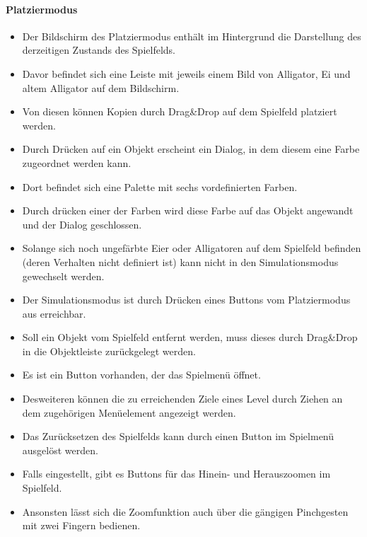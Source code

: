 \paragraph{Platziermodus}
\begin{itemize}
\item Der Bildschirm des Platziermodus enthält im Hintergrund die Darstellung
des derzeitigen Zustands des Spielfelds.
\item Davor befindet sich eine Leiste mit jeweils einem Bild von Alligator, Ei und altem Alligator auf dem Bildschirm.
\item Von diesen können Kopien durch Drag\&Drop auf dem Spielfeld platziert werden. 
\item  Durch Drücken auf ein Objekt erscheint 
ein Dialog, in dem diesem eine Farbe zugeordnet werden kann.
\item Dort befindet sich eine Palette mit sechs vordefinierten Farben.
\item Durch drücken einer der Farben wird diese Farbe auf das Objekt angewandt und der Dialog geschlossen.
\item Solange sich noch ungefärbte Eier oder Alligatoren auf dem Spielfeld befinden (deren Verhalten
nicht definiert ist) kann nicht in den Simulationsmodus gewechselt werden.
\item Der Simulationsmodus ist durch Drücken eines Buttons vom Platziermodus
aus erreichbar.
\item Soll ein Objekt vom Spielfeld entfernt werden, muss dieses durch Drag\&Drop
in die Objektleiste zurückgelegt werden.
\item Es ist ein Button vorhanden, der das Spielmenü öffnet.
\item Desweiteren können die zu erreichenden Ziele eines Level durch Ziehen an dem zugehörigen Menüelement angezeigt werden.
\item Das Zurücksetzen des Spielfelds kann durch einen Button im Spielmenü ausgelöst werden.
\item Falls eingestellt, gibt es Buttons für das Hinein- und Herauszoomen im Spielfeld.
\item Ansonsten lässt sich die Zoomfunktion auch über die gängigen Pinchgesten mit zwei Fingern bedienen.
\end{itemize}

